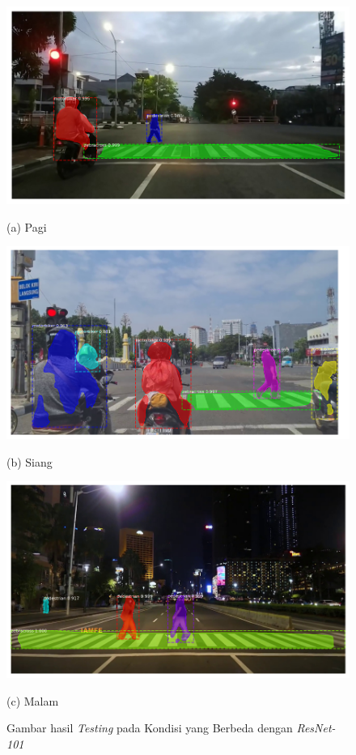 \documentclass[conference]{IEEEtran}
\begin{document}
	\vspace{1ex}
	\begin{figure}[h]
		\centering
		\begin{minipage}[b]{0.2\textwidth}
			\includegraphics[width=\textwidth]{img/fajar-frame800-resnet101.png}
			\caption*{(a) Pagi}
		\end{minipage}
		\hfill
		\begin{minipage}[b]{0.2\textwidth}
			\includegraphics[width=\textwidth]{img/siang-frame465-resnet101.png}
			\caption*{(b) Siang}
		\end{minipage}
		\hfill
		\begin{minipage}[b]{0.2\textwidth}
			\includegraphics[width=\textwidth]{img/malam-frame180-resnet101.png}
			\caption*{(c) Malam}
		\end{minipage}
		\caption{{Gambar hasil \textit{Testing} pada Kondisi yang Berbeda dengan \textit{ResNet-101}}}
		\label{fig:resnet-101}
	\end{figure}
\end{document}
